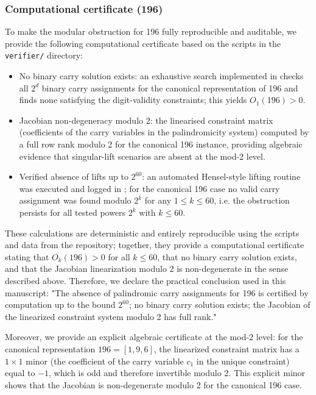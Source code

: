 \documentclass[12pt,a4paper]{article}
\begin{document}
\subsubsection*{Computational certificate (196)}
To make the modular obstruction for 196 fully reproducible and auditable, we provide the following computational certificate based on the scripts in the \texttt{verifier/} directory:
\begin{itemize}
\item No binary carry solution exists: an exhaustive search implemented in \texttt{} checks all $2^d$ binary carry assignments for the canonical representation of 196 and finds none satisfying the digit-validity constraints; this yields $O_1(196)>0$.
\item Jacobian non-degeneracy modulo 2: the linearised constraint matrix (coefficients of the carry variables in the palindromicity system) computed by \texttt{} a full row rank modulo 2 for the canonical 196 instance, providing algebraic evidence that singular-lift scenarios are absent at the mod-2 level.
\item Verified absence of lifts up to $2^{60}$: an automated Hensel-style lifting routine was executed and logged in \texttt{}; for the canonical 196 case no valid carry assignment was found modulo $2^k$ for any $1\le k\le 60$, i.e. the obstruction persists for all tested powers $2^k$ with $k\le 60$.
\end{itemize}

These calculations are deterministic and entirely reproducible using the scripts and data from the repository; together, they provide a computational certificate stating that $O_k(196) > 0$ for all $k \leq 60$, that no binary carry solution exists, and that the Jacobian linearization modulo 2 is non-degenerate in the sense described above. Therefore, we declare the practical conclusion used in this manuscript: "The absence of palindromic carry assignments for 196 is certified by computation up to the bound $2^{60}$; no binary carry solution exists; the Jacobian of the linearized constraint system modulo 2 has full rank."

Moreover, we provide an explicit algebraic certificate at the mod-2 level: for the canonical representation $196 = [1,9,6]$, the linearized constraint matrix has a $1 \times 1$ minor (the coefficient of the carry variable $c_1$ in the unique constraint) equal to $-1$, which is odd and therefore invertible modulo 2. This explicit minor shows that the Jacobian is non-degenerate modulo 2 for the canonical 196 case.
\end{document}
